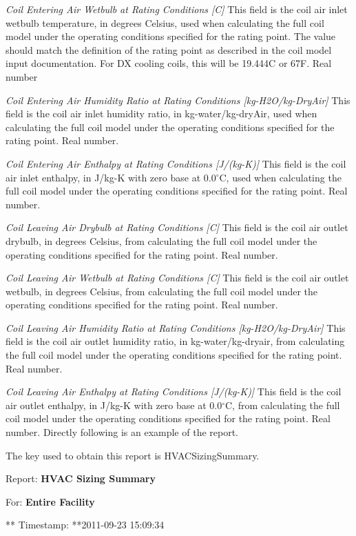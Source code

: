 \emph{Coil Entering Air Wetbulb at Rating Conditions [C]}  This field is the coil air inlet wetbulb temperature, in degrees Celsius, used when calculating the full coil model under the operating conditions specified for the rating point.  The value should match the definition of the rating point as described in the coil model input documentation.  For DX cooling coils, this will be 19.444C or 67F. Real number

\emph{Coil Entering Air Humidity Ratio at Rating Conditions [kg-H2O/kg-DryAir]}  This field is the coil air inlet humidity ratio, in kg-water/kg-dryAir, used when calculating the full coil model under the operating conditions specified for the rating point.  Real number.

\emph{Coil Entering Air Enthalpy at Rating Conditions [J/(kg-K)]}  This field is the coil air inlet enthalpy, in J/kg-K with zero base at 0.0$^\circ$C, used when calculating the full coil model under the operating conditions specified for the rating point. Real number.

\emph{Coil Leaving Air Drybulb at Rating Conditions [C]}  This field is the coil air outlet drybulb, in degrees Celsius, from calculating the full coil model under the operating conditions specified for the rating point. Real number.

\emph{Coil Leaving Air Wetbulb at Rating Conditions [C]}  This field is the coil air outlet wetbulb, in degrees Celsius, from calculating the full coil model under the operating conditions specified for the rating point. Real number.

\emph{Coil Leaving Air Humidity Ratio at Rating Conditions [kg-H2O/kg-DryAir]}  This field is the coil air outlet humidity ratio, in kg-water/kg-dryair, from calculating the full coil model under the operating conditions specified for the rating point. Real number.

\emph{Coil Leaving Air Enthalpy at Rating Conditions [J/(kg-K)]} This field is the coil air outlet enthalpy, in J/kg-K with zero base at 0.0$^\circ$C, from calculating the full coil model under the operating conditions specified for the rating point. Real number.
Directly following is an example of the report.

The key used to obtain this report is HVACSizingSummary.

Report: \textbf{HVAC Sizing Summary}

For: \textbf{Entire Facility}

** Timestamp: **2011-09-23 15:09:34

